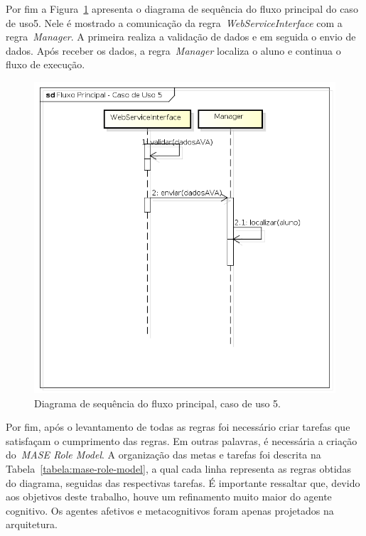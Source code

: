 Por fim a Figura~\ref{fig:dss-uc5-fluxo-principal} apresenta o diagrama de sequência do fluxo principal do caso de uso5. Nele é mostrado a  comunicação da regra~\emph{WebServiceInterface} com a regra~\emph{Manager}. A primeira realiza a validação de dados e em seguida o envio de dados. Após receber os dados, a regra~\emph{Manager} localiza o aluno e continua o fluxo de execução.

\begin{figure}
	\centering
	\includegraphics[scale=0.52]{images/dss-uc5-fluxo-principal.png}
	\caption{Diagrama de sequência do fluxo principal, caso de uso 5.}
	\label{fig:dss-uc5-fluxo-principal}
\end{figure}

Por fim, após o levantamento de todas as regras foi necessário criar tarefas que satisfaçam o cumprimento das regras. Em outras palavras, é necessária a criação do~\emph{MASE Role Model}. A organização das metas e tarefas foi descrita na Tabela~\ref{tabela:mase-role-model}, a qual cada linha representa as regras obtidas do diagrama, seguidas das respectivas tarefas. É importante ressaltar que, devido aos objetivos deste trabalho, houve um refinamento muito maior do agente cognitivo. Os agentes afetivos e metacognitivos foram apenas projetados na arquitetura.

